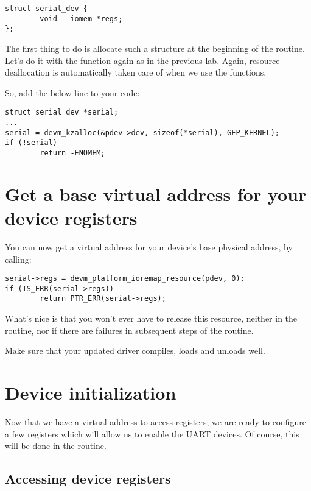 \begin{verbatim}
struct serial_dev {
        void __iomem *regs;
};
\end{verbatim}

The first thing to do is allocate such a structure at the beginning
of the  routine. Let's do it with the 
function again as in the previous lab. Again, resource deallocation is
automatically taken care of when we use the  functions.

So, add the below line to your code:

\begin{verbatim}
struct serial_dev *serial;
...
serial = devm_kzalloc(&pdev->dev, sizeof(*serial), GFP_KERNEL);
if (!serial)
        return -ENOMEM;
\end{verbatim}

\section{Get a base virtual address for your device registers}

You can now get a virtual address for your device's base physical
address, by calling:

\begin{verbatim}
serial->regs = devm_platform_ioremap_resource(pdev, 0);
if (IS_ERR(serial->regs))
        return PTR_ERR(serial->regs);
\end{verbatim}

What's nice is that you won't ever have to release this resource,
neither in the  routine, nor if there are failures
in subsequent steps of the  routine.

Make sure that your updated driver compiles, loads and unloads well.

\section{Device initialization}

Now that we have a virtual address to access registers, we are ready to
configure a few registers which will allow us to enable the UART
devices. Of course, this will be done in the  routine.

\subsection{Accessing device registers}

